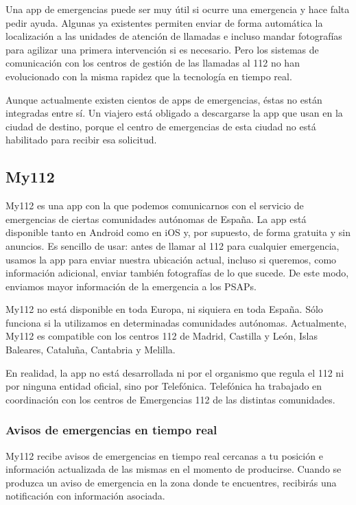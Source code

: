 Una app de emergencias puede ser muy útil si ocurre una emergencia y hace falta pedir ayuda. Algunas ya existentes permiten enviar de forma automática la localización a las unidades de atención de llamadas e incluso mandar fotografías para agilizar una primera intervención si es necesario. Pero los sistemas de comunicación con los centros de gestión de las llamadas al 112 no han evolucionado con la misma rapidez que la tecnología en tiempo real.

Aunque actualmente existen cientos de apps de emergencias, éstas no están integradas entre sí. Un viajero está obligado a descargarse la app que usan en la ciudad de destino, porque el centro de emergencias de esta ciudad no está habilitado para recibir esa solicitud.

\subsection{My112}

My112 es una app con la que podemos comunicarnos con el servicio de emergencias de ciertas comunidades autónomas de España. La app está disponible tanto en Android como en iOS y, por supuesto, de forma gratuita y sin anuncios. Es sencillo de usar: antes de llamar al 112 para cualquier emergencia, usamos la app para enviar nuestra ubicación actual, incluso si queremos, como información adicional, enviar también fotografías de lo que sucede. De este modo, enviamos mayor información de la emergencia a los PSAPs.

My112 no está disponible en toda Europa, ni siquiera en toda España. Sólo funciona si la utilizamos en determinadas comunidades autónomas. Actualmente, My112 es compatible con los centros 112 de Madrid, Castilla y León, Islas Baleares, Cataluña, Cantabria y Melilla.

En realidad, la app no está desarrollada ni por el organismo que regula el 112 ni por ninguna entidad oficial, sino por Telefónica. Telefónica ha trabajado en coordinación con los centros de Emergencias 112 de las distintas comunidades.

\subsubsection{Avisos de emergencias en tiempo real}

My112 recibe avisos de emergencias en tiempo real cercanas a tu posición e información actualizada de las mismas en el momento de producirse. Cuando se produzca un aviso de emergencia en la zona donde te encuentres, recibirás una notificación con información asociada.

